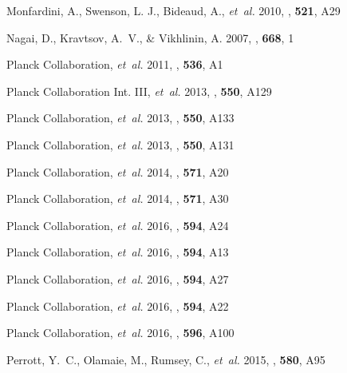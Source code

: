 \documentclass[traditabstract]{aa}
\begin{document}
\begin{thebibliography}{81}
Monfardini, A., Swenson, L. J., Bideaud, A., \emph{et~al.} 2010, \aap, \textbf{521}, A29

{Nagai}, D., {Kravtsov}, A.~V., \& {Vikhlinin}, A. 2007, \apj, \textbf{668}, 1

{Planck Collaboration}, \emph{et~al.} 2011, \aap, \textbf{536}, A1

{Planck Collaboration Int. III}, \emph{et~al.} 2013, \aap, \textbf{550}, A129

{Planck Collaboration}, \emph{et~al.} 2013, \aap, \textbf{550}, A133

{Planck Collaboration}, \emph{et~al.} 2013{}, \aap, \textbf{550}, A131

{Planck Collaboration}, \emph{et~al.} 2014, \aap, \textbf{571}, A20

{Planck Collaboration}, \emph{et~al.} 2014{}, \aap, \textbf{571}, A30

{Planck Collaboration}, \emph{et~al.} 2016{}, \aap, \textbf{594}, A24

{Planck Collaboration}, \emph{et~al.} 2016{}, \aap, \textbf{594}, A13

{Planck Collaboration}, \emph{et~al.} 2016{}, \aap, \textbf{594}, A27

{Planck Collaboration}, \emph{et~al.} 2016{}, \aap, \textbf{594}, A22

{Planck Collaboration}, \emph{et~al.} 2016{}, \aap, \textbf{596}, A100

Perrott, Y.~C., Olamaie, M., Rumsey, C., \emph{et~al.} 2015, \aap, \textbf{580}, A95


\end{thebibliography}
\end{document}
